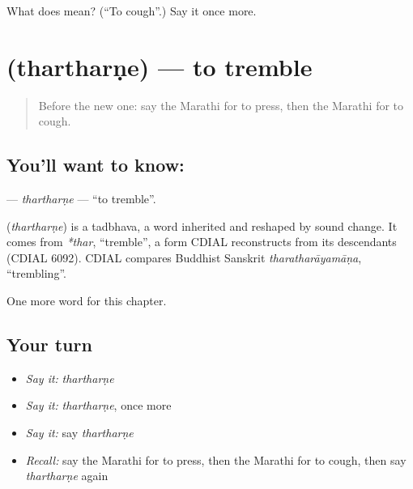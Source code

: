 \begin{tcolorbox}[breakable,colback=teal!4,colframe=teal!35!black,title={Before you move on}]
What does  mean? (\textquotedblleft{}To cough\textquotedblright{}.) Say it once more.
\end{tcolorbox}
\section[\texorpdfstring{\mr{थरथरणे} (thartharṇe)}{थरथरणे (thartharṇe)}]{ (thartharṇe) — to tremble}

\label{lesson:MR-C198-thartharne}



\begin{quote}
Before the new one: say the Marathi for to press, then the Marathi for to cough.
\end{quote}

\subsection*{You'll want to know: }
\textbf{} — \emph{thartharṇe} — \textquotedblleft{}to tremble\textquotedblright{}.

\begin{cousinweb}
\textbf{} (\emph{thartharṇe}) is a tadbhava, a word inherited and reshaped by sound change. It comes from \emph{*thar}, \textquotedblleft{}tremble\textquotedblright{}, a form CDIAL reconstructs from its descendants (CDIAL 6092). CDIAL compares Buddhist Sanskrit \emph{tharatharāyamāṇa}, \textquotedblleft{}trembling\textquotedblright{}.
\end{cousinweb}

\begin{grammarlens}[title={What you've built}]
One more word for this chapter.
\end{grammarlens}

\subsection*{Your turn}
\begin{itemize}
\raggedright
  \item \emph{Say it:} \emph{thartharṇe}
  \item \emph{Say it:} \emph{thartharṇe}, once more
  \item \emph{Say it:} say \emph{thartharṇe}
  \item \emph{Recall:} say the Marathi for to press, then the Marathi for to cough, then say \emph{thartharṇe} again
\end{itemize}

